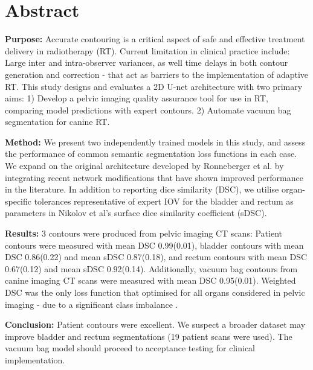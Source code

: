 \chapter{Abstract}
\label{ch:abstract}

\textbf{Purpose:} Accurate contouring is a critical aspect of safe and effective treatment delivery in radiotherapy (RT). Current limitation in clinical practice include: Large inter and intra-observer variances, as well time delays in both contour generation and correction - that act as barriers to the implementation of adaptive RT. This study designs and evaluates a 2D U-net architecture with two primary aims: 1) Develop a pelvic imaging quality assurance tool for use in RT, comparing model predictions with expert contours. 2) Automate vacuum bag segmentation for canine RT.

\textbf{Method:}
 We present two independently trained models in this study, and assess the performance of common semantic segmentation loss functions in each case. We expand on the original architecture developed by Ronneberger et al. by integrating recent network modifications that have shown improved performance in the literature. In addition to reporting dice similarity (DSC), we utilise organ-specific tolerances representative of expert IOV for the bladder and rectum as parameters in Nikolov et al's surface dice similarity coefficient (sDSC).

\textbf{Results:}
3  contours were produced from pelvic imaging CT scans: Patient contours were measured with mean DSC 0.99(0.01), bladder contours with mean DSC 0.86(0.22) and mean sDSC 0.87(0.18), and rectum contours with mean DSC 0.67(0.12) and mean sDSC 0.92(0.14). Additionally, vacuum bag contours from canine imaging CT scans were measured with mean DSC 0.95(0.01). Weighted DSC was the only loss function that optimised for all organs considered in pelvic imaging - due to a significant class imbalance .

\textbf{Conclusion:}
Patient contours were excellent. We suspect a broader dataset may improve bladder and rectum segmentations (19 patient scans were used). The vacuum bag model should proceed to acceptance testing for clinical implementation.
